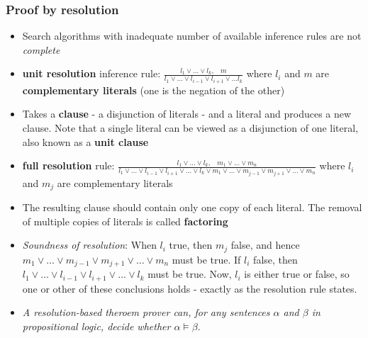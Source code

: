 \documentclass{scrartcl}
\newcommand{\ffrac}[2]{\ensuremath{\frac{\displaystyle #1}{\displaystyle #2}}}
\begin{document}
\subsubsection{Proof by resolution}
\begin{itemize}
    \item
        Search algorithms with inadequate number of available inference rules are not \textit{complete} 
    \item
        \textbf{unit resolution} inference rule: $\ffrac{l_{1} \lor \dots \lor l_{k}, \;\;\; m}{l_{1} \lor \dots \lor l_{i-1} \lor l_{i+1} \lor \dots l_{k}}$
        where $l_{i}$ and $m$ are \textbf{complementary literals} (one is the negation of the other)
    \item
        Takes a \textbf{clause} - a disjunction of literals - and a literal and produces a new clause. Note that a single literal can be viewed as a disjunction of one literal, also known as a \textbf{unit clause}
    \item
        \textbf{full resolution} rule: $\ffrac{l_{1} \lor \dots \lor l_{k}, \;\;\; m_{1} \lor \dots \lor m_{n}}{l_{1} \lor \dots \lor l_{i-1} \lor l_{i+1} \lor \dots \lor l_{k} \lor m_{1} \lor \dots \lor m_{j-1} \lor m_{j+1} \lor \dots \lor m_{n}}$
        where $l_{i}$ and $m_{j}$ are complementary literals
    \item
        The resulting clause should contain only one copy of each literal. The removal of multiple copies of literals is called \textbf{factoring}
    \item
        \textit{Soundness of resolution}: When $l_{i}$ true, then $m_{j}$ false, and hence $m_{1} \lor \dots \lor m_{j-1} \lor m_{j+1} \lor \dots \lor m_{n}$ must be true.
        If $l_{i}$ false, then $l_{1} \lor \dots \lor l_{i-1} \lor l_{i+1} \lor \dots \lor l_{k}$ must be true. Now, $l_{i}$ is either true or false, so one or other of these conclusions holds - exactly as the resolution rule states.
    \item
        \textit{A resolution-based theroem prover can, for any sentences $\alpha$ and $\beta$ in propositional logic, decide whether $\alpha \vDash \beta$}.
\end{itemize}
\end{document}
